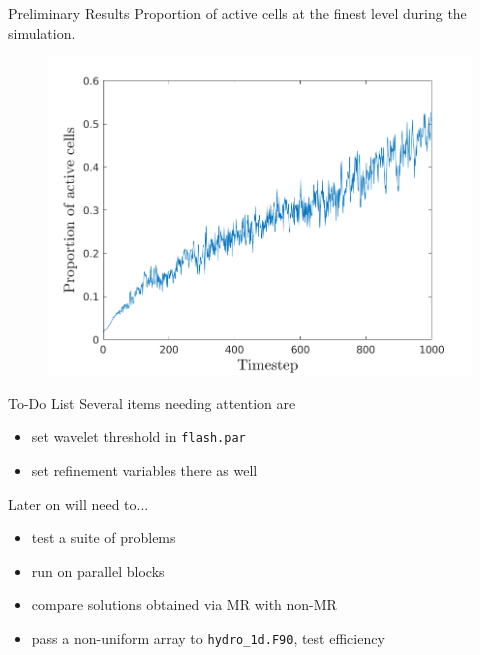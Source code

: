 \documentclass{beamer}
\begin{document}
\begin{frame}{Preliminary Results}
  Proportion of active cells at the finest level during the simulation.
  \begin{figure}
    \center
    \includegraphics[scale=0.5]{numactive_lores.png}
  \end{figure}
\end{frame}

\begin{frame}[fragile]{To-Do List}
  Several items needing attention are
  \begin{itemize}
    \setlength\itemsep{1em}
    \item set wavelet threshold in \texttt{flash.par}
    \item set refinement variables there as well
  \end{itemize}
  Later on will need to...
  \begin{itemize}
    \item test a suite of problems
    \item run on parallel blocks
    \item compare solutions obtained via MR with non-MR
    \item pass a non-uniform array to \texttt{hydro\_1d.F90}, test efficiency
  \end{itemize}
\end{frame}
\end{document}
